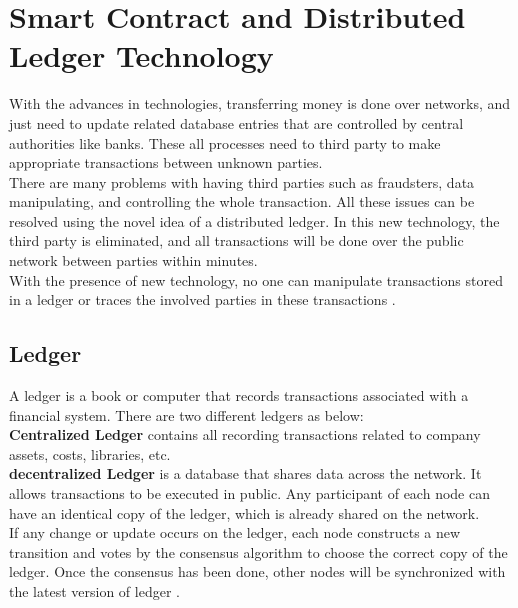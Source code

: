 \chapter{Smart Contract and Distributed Ledger Technology}
With the advances in technologies, transferring money is done over networks, and just need to update related database entries that are controlled by central authorities like banks. These all processes need to third party to make appropriate transactions between unknown parties. \\
There are many problems with having third parties such as fraudsters, data manipulating, and controlling the whole transaction. All these issues can be resolved using the novel idea of a distributed ledger. In this new technology, the third party is eliminated, and all transactions will be done over the public network between parties within minutes. \\
With the presence of new technology, no one can manipulate transactions stored in a ledger or traces the involved parties in these transactions \cite {Masood}. 
\section{Ledger} 
A ledger is a book or computer that records transactions associated with a financial system. There are two different ledgers as below: \\
\textbf{Centralized Ledger} contains all recording transactions related to company assets, costs, libraries, etc. \\
\textbf{decentralized Ledger} is a database that shares data across the network. It allows transactions to be executed in public. Any participant of each node can have an identical copy of the ledger, which is already shared on the network.\\
If any change or update occurs on the ledger, each node constructs a new transition and votes by the consensus algorithm to choose the correct copy of the ledger. Once the consensus has been done, other nodes will be synchronized with the latest version of ledger \cite{Markos}.

